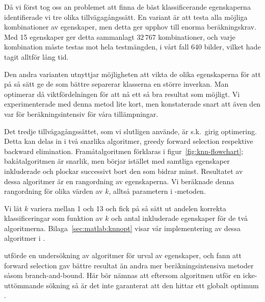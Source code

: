 \documentclass[../rapport_MVEX01-11-05]{subfiles}
\begin{document}
Då vi först tog oss an problemet att finna de bäst klassificerande
egenskaperna identifierade vi tre olika tillvägagångssätt. En variant är att
testa alla möjliga kombinationer av egenskaper,
men detta ger upphov till enorma beräkningskrav. Med 15
egenskaper ger detta sammanlagt $32\,767$ kombinationer, och varje kombination
måste testas mot hela testmängden, i vårt fall 640 bilder, vilket hade tagit
alltför lång tid.
 
Den andra varianten utnyttjar
möjligheten att vikta de olika egenskaperna för att på så sätt ge de som bättre
separerar klasserna en
större inverkan. Man optimerar då
viktfördelningen för att nå ett så bra resultat som möjligt. Vi experimenterade
med denna metod lite kort, men konstaterade snart att även den var för 
beräkningsintensiv för våra tillämpningar.

Det tredje tillvägagångssättet, som vi slutligen 
använde, är s.k.~girig optimering. Detta kan delas in i två snarlika 
algoritmer, greedy forward selection respektive backward elimination.
Framåtalgoritmen förklaras 
i figur~\vref{fig:knn-flowchart}; bakåtalgoritmen är snarlik, men börjar 
istället med samtliga egenskaper inkluderade och plockar successivt bort den 
som bidrar minst.
Resultatet av dessa algoritmer är en rangordning av egenskaperna.
Vi beräknade denna rangordning för olika värden
av $k$, alltså parametern i \knn-metoden.

Vi lät $k$ variera mellan 1 och 13 och fick på så sätt ut andelen
korrekta klassificeringar som funktion av $k$ och antal inkluderade egenskaper
för de två algoritmerna. Bilaga~\ref{sec:matlab:knnopt} visar vår
implementering av dessa algoritmer i \MATLAB.

 utförde en undersökning av algoritmer för urval av egenskaper,
och fann att forward selection gav bättre resultat än andra mer beräkningsintensiva
metoder såsom branch-and-bound.
Här bör nämnas att eftersom algoritmen utför en icke-uttömmande sökning så är
det inte garanterat att den hittar ett globalt optimum \cite{Cover77}.
\end{document}
